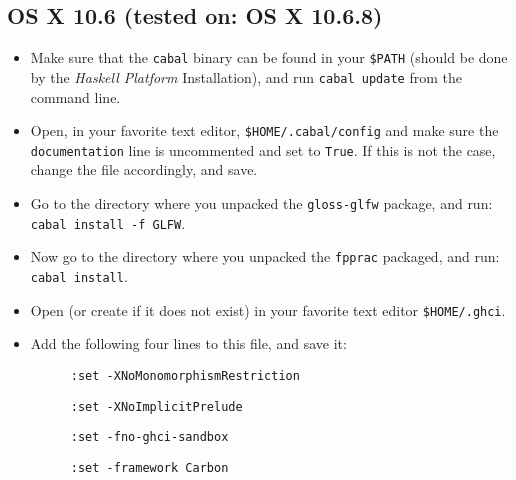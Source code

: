 \documentclass[]{article}
\begin{document}
\subsection{OS X 10.6 (tested on: OS X 10.6.8)}
\begin{itemize}
  \item Make sure that the \texttt{cabal} binary can be found in your \texttt{\$PATH} (should be done by the \emph{Haskell Platform} Installation), and run \texttt{cabal update} from the command line.
  \item Open, in your favorite text editor, \texttt{\$HOME/.cabal/config} and make sure the \texttt{documentation} line is uncommented and set to \texttt{True}. If this is not the case, change the file accordingly, and save.
  \item Go to the directory where you unpacked the \texttt{gloss-glfw} package, and run: \texttt{cabal install -f GLFW}.
  \item Now go to the directory where you unpacked the \texttt{fpprac} packaged, and run: \texttt{cabal install}.
  \item Open (or create if it does not exist) in your favorite text editor \texttt{\$HOME/.ghci}.
  \item Add the following four lines to this file, and save it:
  \begin{description}
    \item[] \texttt{:set -XNoMonomorphismRestriction}
    \item[] \texttt{:set -XNoImplicitPrelude}
    \item[] \texttt{:set -fno-ghci-sandbox}
    \item[] \texttt{:set -framework Carbon}
  \end{description}
\end{itemize}
\end{document}
